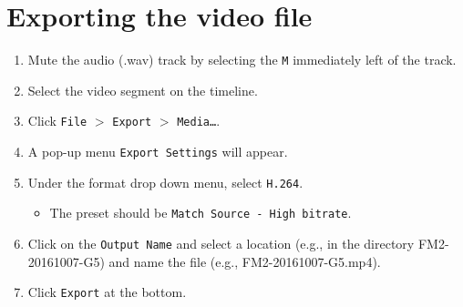 \documentclass{article}
\begin{document}
\section*{Exporting the video file}
\begin{enumerate}
  \item Mute the audio (.wav) track by selecting the \texttt{M} immediately left of the track.
  \item Select the video segment on the timeline.
  \item Click \texttt{File} $>$ \texttt{Export} $>$ \texttt{Media\ldots}.
  \item A pop-up menu \texttt{Export Settings} will appear.
  \item Under the format drop down menu, select \texttt{H.264}.
  \begin{itemize}
    \item The preset should be \texttt{Match Source - High bitrate}.
  \end{itemize}
  \item Click on the \texttt{Output Name} and select a location (e.g., in the directory FM2-20161007-G5) and name the file (e.g., FM2-20161007-G5.mp4).
  \item Click \texttt{Export} at the bottom.
\end{enumerate}
\end{document}
